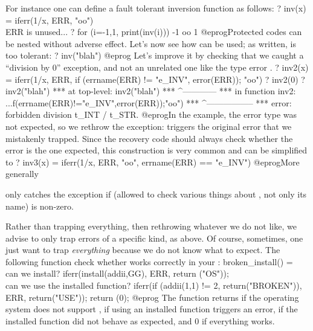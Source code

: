 For instance one can define a fault tolerant inversion function as follows:
\bprog
? inv(x) = iferr(1/x, ERR, "oo")    \\ ERR is unused...
? for (i=-1,1, print(inv(i)))
-1
oo
1
@eprog\noindent Protected codes can be nested without adverse effect.
Let's now see how  can be used; as written,  is too
tolerant:
\bprog
? inv("blah")
@eprog Let's improve it by checking that we caught a ``division by 0''
exception, and not an unrelated one like the type error .
\bprog
? inv2(x) = {
  iferr(1/x,
        ERR, if (errname(ERR) != "e_INV", error(ERR)); "oo")
}
? inv2(0)
? inv2("blah")
  ***   at top-level: inv2("blah")
  ***                 ^------------
  ***   in function inv2: ...f(errname(ERR)!="e_INV",error(ERR));"oo")
  ***                                                 ^-----------------
  *** error: forbidden division t_INT / t_STR.
  @eprog\noindent In the  example, the error type was not
expected, so we rethrow the exception:  triggers the original
error that we mistakenly trapped. Since the recovery code should always check
whether the error is the one expected, this construction is very common and
can be simplified to
\bprog
? inv3(x) = iferr(1/x,
                  ERR, "oo",
                  errname(ERR) == "e_INV")
@eprog\noindent More generally


\noindent only catches the exception if  (allowed to check
various things about , not only its name) is non-zero.

Rather than trapping everything, then rethrowing whatever we do not like, we
advise to only trap errors of a specific kind, as above. Of course,
sometimes, one just want to trap \emph{everything} because we do not know
what to expect. The following function check whether  works
correctly in your :
\bprog
broken_install() =
{ \\ can we install?
  iferr(install(addii,GG),
        ERR, return ("OS"));
  \\ can we use the installed function?
  iferr(if (addii(1,1) != 2, return("BROKEN")),
        ERR, return("USE"));
  return (0);
}
@eprog
\noindent The function returns
 if the operating system does not support ,
 if using an installed function triggers an error,
 if the installed function did not behave as expected,
and 0 if everything works.

